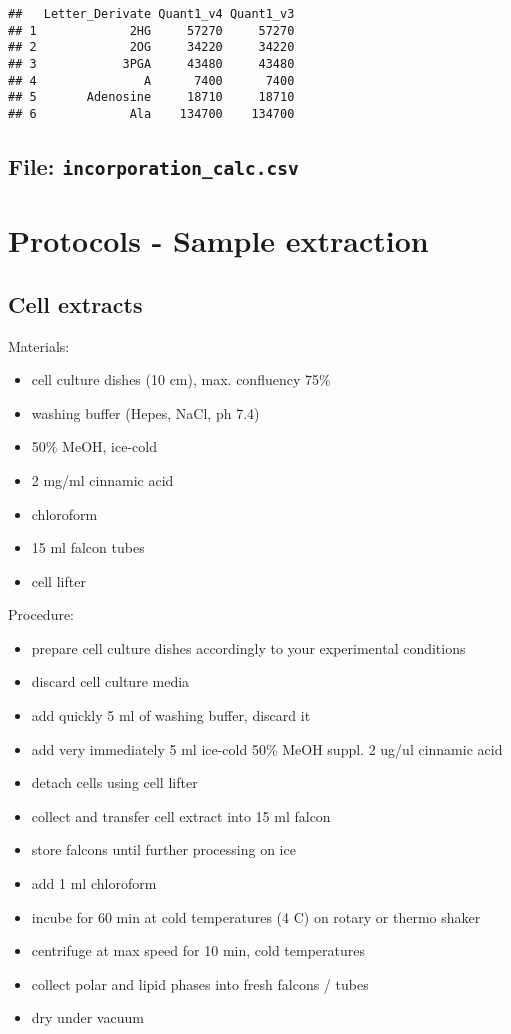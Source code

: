 \documentclass[]{book}
\providecommand{\tightlist}{%
  \setlength{\itemsep}{0pt}\setlength{\parskip}{0pt}}
\theoremstyle{definition}
\theoremstyle{definition}
\theoremstyle{definition}
\theoremstyle{remark}
\begin{document}
\begin{verbatim}
##   Letter_Derivate Quant1_v4 Quant1_v3
## 1             2HG     57270     57270
## 2             2OG     34220     34220
## 3            3PGA     43480     43480
## 4               A      7400      7400
## 5       Adenosine     18710     18710
## 6             Ala    134700    134700
\end{verbatim}

\section{\texorpdfstring{File:
\texttt{incorporation\_calc.csv}}{File: incorporation\_calc.csv}}\label{file-incorporation_calc.csv}

\chapter{Protocols - Sample
extraction}\label{protocols---sample-extraction}

\section{Cell extracts}\label{cell-extracts}

Materials:

\begin{itemize}
\tightlist
\item
  cell culture dishes (10 cm), max. confluency 75\%
\item
  washing buffer (Hepes, NaCl, ph 7.4)
\item
  50\% MeOH, ice-cold
\item
  2 mg/ml cinnamic acid
\item
  chloroform
\item
  15 ml falcon tubes
\item
  cell lifter
\end{itemize}

Procedure:

\begin{itemize}
\tightlist
\item
  prepare cell culture dishes accordingly to your experimental
  conditions
\item
  discard cell culture media
\item
  add quickly 5 ml of washing buffer, discard it
\item
  add very immediately 5 ml ice-cold 50\% MeOH suppl. 2 ug/ul cinnamic
  acid
\item
  detach cells using cell lifter
\item
  collect and transfer cell extract into 15 ml falcon
\item
  store falcons until further processing on ice
\item
  add 1 ml chloroform
\item
  incube for 60 min at cold temperatures (4 C) on rotary or thermo
  shaker
\item
  centrifuge at max speed for 10 min, cold temperatures
\item
  collect polar and lipid phases into fresh falcons / tubes
\item
  dry under vacuum
\end{itemize}
\end{document}
